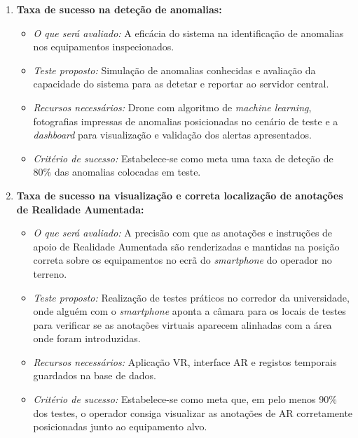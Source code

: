 \documentclass[conference,a4paper]{IEEEtran}
\begin{document}
\begin{enumerate}
    \item \textbf{Taxa de sucesso na deteção de anomalias:}
    \begin{itemize}
        \item \textit{O que será avaliado:} A eficácia do sistema na identificação de anomalias nos equipamentos inspecionados.
        \item \textit{Teste proposto:} Simulação de anomalias conhecidas e avaliação da capacidade do sistema para as detetar e reportar ao servidor central.
        \item \textit{Recursos necessários:} Drone com algoritmo de \textit{machine learning}, fotografias impressas de anomalias posicionadas no cenário de teste e a \textit{dashboard} para visualização e validação dos alertas apresentados.
        \item \textit{Critério de sucesso:} Estabelece-se como meta uma taxa de deteção de 80\% das anomalias colocadas em teste.
    \end{itemize}

    \item \textbf{Taxa de sucesso na visualização e correta localização de anotações de Realidade Aumentada:}
    \begin{itemize}
        \item \textit{O que será avaliado:} A precisão com que as anotações e instruções de apoio de Realidade Aumentada são renderizadas e mantidas na posição correta sobre os equipamentos no ecrã do \textit{smartphone} do operador no terreno.
        \item \textit{Teste proposto:} Realização de testes práticos no corredor da universidade, onde alguém com o \textit{smartphone} aponta a câmara para os locais de testes para verificar se as anotações virtuais aparecem alinhadas com a área onde foram introduzidas.
        \item \textit{Recursos necessários:} Aplicação VR, interface AR e registos temporais guardados na base de dados.
        \item \textit{Critério de sucesso:} Estabelece-se como meta que, em pelo menos 90\% dos testes, o operador consiga visualizar as anotações de AR corretamente posicionadas junto ao equipamento alvo.
    \end{itemize}


\end{enumerate}
\end{document}
